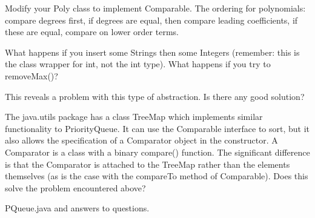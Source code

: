 \documentclass{article}
\newcounter{problem}
\begin{document}
Modify your Poly class to implement Comparable. The ordering for polynomials:
compare degrees first, if degrees are equal, then compare leading 
coefficients, if these are equal, compare on lower order terms.



What happens if you insert some Strings then some Integers (remember:
this is the class wrapper for int, not the int type). What happens if
you try to removeMax()? 

This reveals a problem with this type of abstraction. Is there
any good solution?

The java.utils package has a class TreeMap which implements similar 
functionality to PriorityQueue. It can use the Comparable interface to
sort, but it also allows the specification of a Comparator object in the
constructor. A Comparator is a class with a binary compare() function. 
The significant difference is that the Comparator is
attached to the TreeMap rather than the elements themselves (as
is the case with the compareTo method of Comparable). 
Does this solve the problem encountered above?

 PQueue.java and answers to questions.
\end{document}
